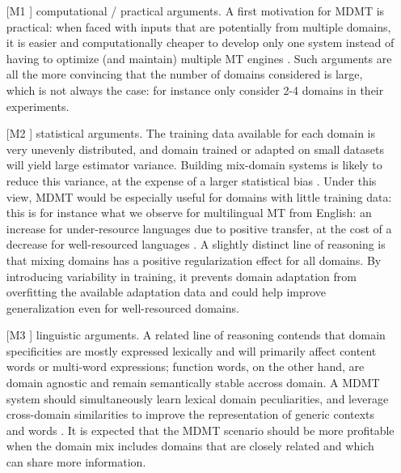 \documentclass[11pt]{article}
\newcommand{\fyTodo}[1]{\Todo[FY:]{\textcolor{orange}{#1}}}
\begin{document}
\begin{enumerate}
\item[[M1\hspace{-0.5em}]] computational / practical arguments. A first motivation for MDMT is practical: when faced with inputs that are potentially from multiple domains, it is easier and computationally cheaper to develop only one system instead of having to optimize (and maintain) multiple MT engines \cite{Sennrich13multidomain,Farajian17neural}. Such arguments are all the more convincing that the number of domains considered is large, which is not always the case: for instance \cite{Britz17mixing,Zeng18multidomain,Jiang19multidomain} only consider 2-4 domains in their experiments.
  
\item[[M2\hspace{-0.5em}]] statistical arguments. The training data available for each domain is very unevenly distributed, and domain trained or adapted on small datasets will yield large estimator variance. Building mix-domain systems is likely to reduce this variance, at the expense of a larger statistical bias \cite{Clark12onesystem}. Under this view, MDMT would be especially useful for domains with little training data: this is for instance what we observe for multilingual MT from English: an increase for under-resource languages due to positive transfer, at the cost of a decrease for well-resourced languages \cite{Arivazhagan19massively}. A slightly distinct line of reasoning is that mixing domains has a positive regularization effect for all domains. By introducing variability in training, it prevents domain adaptation from overfitting the available adaptation data and could help improve generalization even for well-resourced domains.

\item[[M3\hspace{-0.5em}]] linguistic arguments. A related line of reasoning contends that domain specificities are mostly expressed lexically and will primarily affect content words or multi-word expressions; function words, on the other hand, are domain agnostic and remain semantically stable accross domain. A MDMT system should simultaneously learn lexical domain peculiarities, and leverage cross-domain similarities to improve the representation of generic contexts and words \cite{Zeng18multidomain,Pham19generic}. It is expected that the MDMT scenario should be more profitable when the domain mix includes domains that are closely related and which can share more information. \fyTodo{polysemy}
\end{enumerate}
\end{document}
